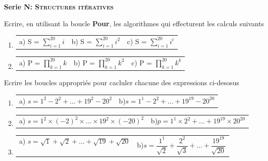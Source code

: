 \documentclass[10pt,a4paper,notitlepage]{article}
\begin{document}
\begin{center}
    \large{\textbf{Serie N: \textsc{Structures it\'eratives}}}
\end{center}
\begin{definition}[]
    \hspace{2ex}Ecrire, en utilisant la boucle \textbf{Pour}, les algorithmes qui effecturent les calculs suivants
    \begin{enumerate}
        \item
              \begin{tabular}{p{3cm}p{3cm}p{3cm}}
                  a) S = $\sum_{i=1}^{20} i$ & b) S = $\sum_{i=1}^{20} i^2$ & c) S = $ \sum_{i=1}^{20} i^i$
              \end{tabular}
        \item
              \begin{tabular}{p{3cm}p{3cm}p{3cm}}
                  a) P = $\prod_{k=1}^{20} k$ & b) P = $ \prod_{k=1}^{20} k^2$ & c) P = $ \prod_{k=1}^{20} k^k $ \\
              \end{tabular}
    \end{enumerate}
\end{definition}
\begin{definition}
    \hspace{2ex} Ecrire les boucles appropri\'es pour cacluler chacune des expressions ci-desosus\\
    \begin{enumerate}
        \item
              \begin{tabular}{p{7cm}p{7cm}}
                  a) $s= 1^2-2^2+\dots +19^2-20^2$ & b)$ s = 1^1 - 2^2 + \dots +19^{19} -20^{20}$ \\
              \end{tabular}
        \item
              \begin{tabular}{p{7cm}p{7cm}}
                  a) $s= 1^2\times (-2)^2 \times \dots \times 19^2 \times (-20)^{2}$ & b)$ p = 1^1 \times 2^2 + \dots +19^{19} \times 20^{20}$ \\
              \end{tabular}
        \item
              \begin{tabular}{p{7cm}p{7cm}}
                  a) $s= \sqrt{1}+\sqrt{2}+\dots +\sqrt{19}+\sqrt{20}$ & b)$ s = \dfrac{1^1}{\sqrt{2}} + \dfrac{2^2}{\sqrt{3}} + \dots +\dfrac{19^{19}}{\sqrt{20}}$ \\
              \end{tabular}
    \end{enumerate}
\end{definition}
\end{document}
